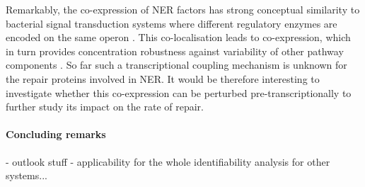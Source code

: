 Remarkably, the co-expression of NER factors has strong conceptual similarity to bacterial signal transduction systems where different regulatory enzymes are encoded on the same operon \cite{Kollmann2005,Lovdok2009}. This co-localisation leads to co-expression, which in turn provides concentration robustness against variability of other pathway components \cite{Bluthgen2013}. So far such a transcriptional coupling mechanism is unknown for the repair proteins involved in NER. It would be therefore interesting to investigate whether this co-expression can be perturbed pre-transcriptionally to further study its impact on the rate of repair. 



\paragraph{Concluding remarks}
- outlook stuff 
- applicability for the whole identifiability analysis for other systems...
